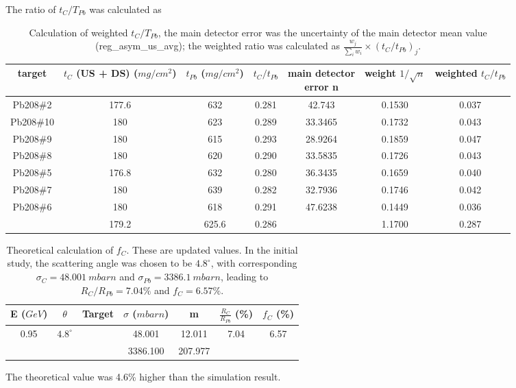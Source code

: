The ratio of $t_C/T_{Pb}$ was calculated as
\begin{table}[!h]
    \centering
    \begin{tabular}{c | c c c | c c c}
	\hline
	target	& \makecell{$t_C$ (US + DS) \\ ($mg/cm^2$)} & \makecell{$t_{Pb}$ \\ ($mg/cm^2$)}	
	& $t_C/t_{Pb}$  & \makecell{main detector \\ error n} & \makecell{weight \\ $1/\sqrt{n}$}    & \makecell{weighted \\ $t_C/t_{Pb}$} \\
	\hline
	Pb208\#2    & 177.6	& 632	& 0.281	& 42.743    & 0.1530	& 0.037 \\
	Pb208\#10   & 180	& 623	& 0.289	& 33.3465   & 0.1732	& 0.043	\\
	Pb208\#9    & 180	& 615   & 0.293 & 28.9264   & 0.1859   	& 0.047	\\
	Pb208\#8    & 180	& 620   & 0.290 & 33.5835   & 0.1726   	& 0.043	\\
	Pb208\#5    & 176.8	& 632   & 0.280 & 36.3435   & 0.1659   	& 0.040	\\
	Pb208\#7    & 180	& 639   & 0.282 & 32.7936   & 0.1746   	& 0.042	\\
	Pb208\#6    & 180	& 618   & 0.291 & 47.6238   & 0.1449   	& 0.036	\\
	\hline
		    & 179.2	& 625.6	& 0.286	&	    & 1.1700	& \color{red} 0.287 \\
	\hline                                                
    \end{tabular}
    \caption{Calculation of weighted $t_C/T_{Pb}$, the main detector error was
    the uncertainty of the main detector mean value (reg\_asym\_us\_avg); the 
    weighted ratio was calculated as $\frac{w_j}{\sum_i w_i} \times \left( t_C/t_{Pb} \right)_j$.}
    \label{tab:ratio_of_area_density}
\end{table}

\begin{table}[!h]
    \centering
    \begin{tabular}{c c | c c c | c c}
	\hline
	E ($GeV$)   & $\theta$  & Target    & $\sigma$ ($mbarn$)    & m & $\frac{R_C}{R_{Pb}}$ (\%) & $f_C$ (\%)    \\
	\hline
	\multirow{2}{*}{0.95}	& \multirow{2}{*}{$4.8^\circ$}	& 
	      \C    & 48.001	& 12.011    & \multirow{2}{*}{7.04} & \multirow{2}{*}{6.57} \\
	\cline{3-5}
	&   & \Pb   & 3386.100	& 207.977   &	& \\
	\hline
    \end{tabular}
    \caption{Theoretical calculation of $f_C$. These are updated values. In the 
    initial study, the scattering angle was chosen to be $4.8^\circ$, with corresponding
    $\sigma_C = 48.001\ mbarn$ and $\sigma_{Pb} = 3386.1\ mbarn$, leading to
    $R_C/R_{Pb} = 7.04\%$ and $f_C = 6.57\%$.}
\end{table}
The theoretical value was 4.6\% higher than the simulation result.

